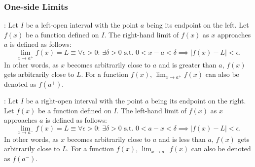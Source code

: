 \documentclass[a4paper,12pt]{report}
\begin{document}
\subsubsection{One-side Limits}
: Let \(I\) be a left-open interval with the point \(a\) being its endpoint on the left. Let \( f(x) \) be a function defined on \(I\). The right-hand limit of \( f(x) \) as \( x \) approaches \( a \) is defined as follows:
\[\lim_{x \to a^+} f(x) = L \equiv \forall \epsilon > 0 :\,\exists \delta > 0 \text{\ s.t.\ } 0 < x - a < \delta \implies |f(x) - L| < \epsilon.\]
In other words, as \(x\) becomes arbitrarily close to \(a\) and is greater than \(a\), \(f(x)\) gets arbitrarily close to \(L\). For a function $f(x)$, $\lim_{x\to a^+}f(x)$ can also be denoted as $f(a^+)$.

: Let \(I\) be a right-open interval with the point \(a\) being its endpoint on the right. Let \( f(x) \) be a function defined on \(I\). The left-hand limit of \( f(x) \) as \( x \) approaches \( a \) is defined as follows:
\[\lim_{x \to a^-} f(x) = L \equiv \forall \epsilon > 0 :\,\exists \delta > 0 \text{\ s.t.\ } 0 < a - x < \delta \implies |f(x) - L| < \epsilon.\]
In other words, as \(x\) becomes arbitrarily close to \(a\) and is less than \(a\), \(f(x)\) gets arbitrarily close to \(L\). For a function $f(x)$, $\lim_{x\to a^-}f(x)$ can also be denoted as $f(a^-)$.
\end{document}
